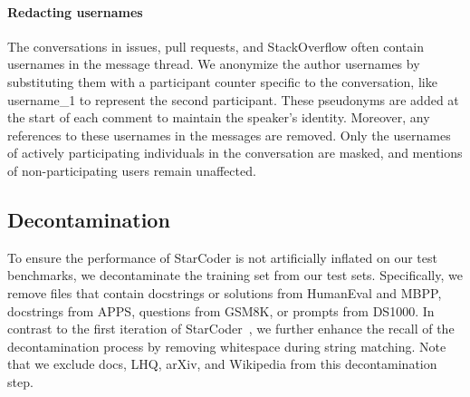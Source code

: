 \documentclass[10pt]{article} %
\begin{document}
\begin{table}[t]
    \caption{Overview of the data processing steps applied to each data source.}
    \label{tab:dataset_processing}
    \centering
    \setlength\extrarowheight{2pt}
\end{table}

\paragraph{Redacting usernames} The conversations in issues, pull requests, and StackOverflow often contain usernames in the message thread. We anonymize the author usernames by substituting them with a participant counter specific to the conversation, like username\_1 to represent the second participant. These pseudonyms are added at the start of each comment to maintain the speaker's identity. Moreover, any references to these usernames in the messages are removed. Only the usernames of actively participating individuals in the conversation are masked, and mentions of non-participating users remain unaffected.

\subsection{Decontamination}\label{sec:decontamination}
To ensure the performance of StarCoder is not artificially inflated on our test benchmarks, we decontaminate the training set from our test sets. Specifically, we remove files that contain docstrings or solutions from HumanEval and MBPP, docstrings from APPS, questions from GSM8K, or prompts from DS1000. In contrast to the first iteration of StarCoder~\citep{li2023starcoder}, we further enhance the recall of the decontamination process by removing whitespace during string matching. Note that we exclude docs, LHQ, arXiv, and Wikipedia from this decontamination step.  
\end{document}

